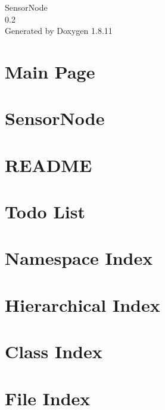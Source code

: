 \documentclass[twoside]{book}
\newcommand{\+}{\discretionary{\mbox{\scriptsize$\hookleftarrow$}}{}{}}
\newcommand{\clearemptydoublepage}{%
  \newpage{\pagestyle{empty}\cleardoublepage}%
}
\begin{document}
\hypersetup{pageanchor=false,
             bookmarksnumbered=true,
             pdfencoding=unicode
            }
\begin{titlepage}
\vspace*{7cm}
\begin{center}%
{\Large Sensor\+Node \\[1ex]\large 0.\+2 }\\
\vspace*{1cm}
{\large Generated by Doxygen 1.8.11}\\
\end{center}
\end{titlepage}
\clearemptydoublepage
\tableofcontents
\clearemptydoublepage
{}
\hypersetup{pageanchor=true}

\chapter{Main Page}
\label{index}\hypertarget{index}{}
\chapter{Sensor\+Node}
\label{md_src_README}
\hypertarget{md_src_README}{}

\chapter{R\+E\+A\+D\+ME}
\label{md_Python_README}
\hypertarget{md_Python_README}{}

\chapter{Todo List}
\label{todo}
\hypertarget{todo}{}

\chapter{Namespace Index}

\chapter{Hierarchical Index}

\chapter{Class Index}

\chapter{File Index}

\end{document}
